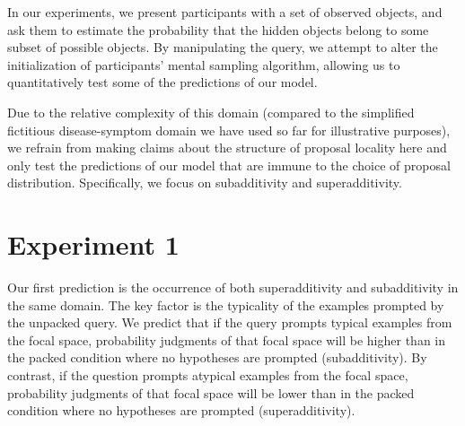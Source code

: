 In our experiments, we present participants with a set of observed objects, and ask them to estimate the probability that the hidden objects belong to some subset of possible objects. By manipulating the query, we attempt to alter the initialization of participants' mental sampling algorithm, allowing us to quantitatively test some of the predictions of our model. 

Due to the relative complexity of this domain (compared to the simplified fictitious disease-symptom domain we have used so far for illustrative purposes), we refrain from making claims about the structure of proposal locality here and only test the predictions of our model that are immune to the choice of proposal distribution. Specifically, we focus on subadditivity and superadditivity.




\section{Experiment 1}

Our first prediction is the occurrence of both superadditivity and subadditivity in the same domain. The key factor is the typicality of the examples prompted by the unpacked query. We predict that if the query prompts typical examples from the focal space, probability judgments of that focal space will be higher than in the packed condition where no hypotheses are prompted (subadditivity). By contrast, if the question prompts atypical examples from the focal space, probability judgments of that focal space will be lower than in the packed condition where no hypotheses are prompted (superadditivity).

